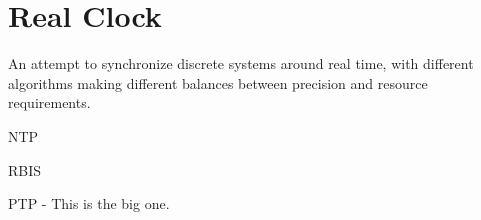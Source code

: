 \section{Real Clock}\label{sc:realClock}

An attempt to synchronize discrete systems around real time, with different algorithms making different balances between precision and resource requirements.

NTP

RBIS

PTP - This is the big one.

